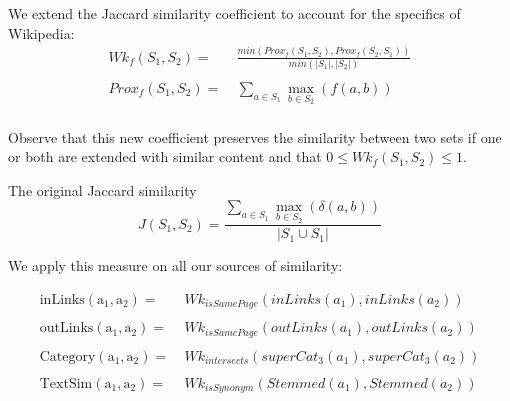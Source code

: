 \documentclass[xcolor=dvipsnames]{beamer}
\newcommand{\textSim}[2]{\mathrm{TextSim(#1,#2)}}
\newcommand{\inLinks}[2]{\mathrm{inLinks(#1,#2)}}
\newcommand{\outLinks}[2]{\mathrm{outLinks(#1,#2)}}
\newcommand{\category}[2]{\mathrm{Category(#1,#2)}}
\newcommand{\wikiJack}[3]{Wk_{#1}(#2,#3)}
\newcommand{\setProximity}[3]{Prox_{#1}(#2,#3)}
\begin{document}



\begin{frame}
We extend the Jaccard similarity coefficient to account for the specifics of Wikipedia:
\begin{align*}	
\wikiJack{f}{S_1}{S_2} =&\ \frac{min(\setProximity{f}{S_1}{S_2}, \setProximity{f}{S_2}{S_1})}{min(|S_1|,|S_2|)}\\
\\
\setProximity{f}{S_1}{S_2} =&\ \sum\limits_{a \in S_1} \max\limits_{b \in S_2}(f(a,b))\\
\end{align*}

Observe that this new coefficient preserves the similarity between two sets if one or both are extended with similar content and that $ 0 \leq \wikiJack{f}{S_1}{S_2} \leq 1 $.

\begin{block}{The original Jaccard similarity}
$$J(S_1,S_2) = \frac{\sum\limits_{a \in S_1} \max\limits_{b \in S_2}(\delta(a,b))}{|S_1 \cup S_1|}$$
\end{block}
\end{frame}


\begin{frame}

We apply this measure on all our sources of similarity: 

\begin{align*}
	\inLinks{a_1}{a_2} =&\ \wikiJack{isSamePage}{inLinks(a_1)}{inLinks(a_2)}\\
	\\
	\outLinks{a_1}{a_2} =&\ \wikiJack{isSamePage}{outLinks(a_1)}{outLinks(a_2)}\\
	\\
	\category{a_1}{a_2} =&\  \wikiJack{intersects}{superCat_3(a_1)}{superCat_3(a_2)}\\
	\\
	\textSim{a_1}{a_2} =&\  \wikiJack{isSynonym}{Stemmed(a_1)}{Stemmed(a_2)}\\
\end{align*}
\end{frame}
\end{document}
